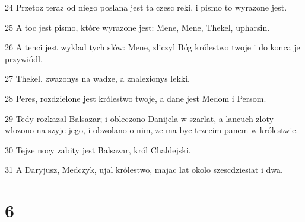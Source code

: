 \par 24 Przetoz teraz od niego poslana jest ta czesc reki, i pismo to wyrazone jest.
\par 25 A toc jest pismo, które wyrazone jest: Mene, Mene, Thekel, upharsin.
\par 26 A tenci jest wyklad tych slów: Mene, zliczyl Bóg królestwo twoje i do konca je przywiódl.
\par 27 Thekel, zwazonys na wadze, a znalezionys lekki.
\par 28 Peres, rozdzielone jest królestwo twoje, a dane jest Medom i Persom.
\par 29 Tedy rozkazal Balsazar; i obleczono Danijela w szarlat, a lancuch zloty wlozono na szyje jego, i obwolano o nim, ze ma byc trzecim panem w królestwie.
\par 30 Tejze nocy zabity jest Balsazar, król Chaldejski.
\par 31 A Daryjusz, Medczyk, ujal królestwo, majac lat okolo szescdziesiat i dwa.

\chapter{6}

